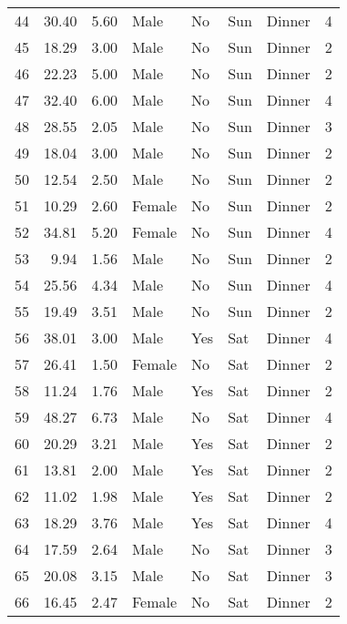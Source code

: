 \begin{tabular}{lrrllllr}
44  &       30.40 &   5.60 &    Male &     No &   Sun &  Dinner &     4 \\
45  &       18.29 &   3.00 &    Male &     No &   Sun &  Dinner &     2 \\
46  &       22.23 &   5.00 &    Male &     No &   Sun &  Dinner &     2 \\
47  &       32.40 &   6.00 &    Male &     No &   Sun &  Dinner &     4 \\
48  &       28.55 &   2.05 &    Male &     No &   Sun &  Dinner &     3 \\
49  &       18.04 &   3.00 &    Male &     No &   Sun &  Dinner &     2 \\
50  &       12.54 &   2.50 &    Male &     No &   Sun &  Dinner &     2 \\
51  &       10.29 &   2.60 &  Female &     No &   Sun &  Dinner &     2 \\
52  &       34.81 &   5.20 &  Female &     No &   Sun &  Dinner &     4 \\
53  &        9.94 &   1.56 &    Male &     No &   Sun &  Dinner &     2 \\
54  &       25.56 &   4.34 &    Male &     No &   Sun &  Dinner &     4 \\
55  &       19.49 &   3.51 &    Male &     No &   Sun &  Dinner &     2 \\
56  &       38.01 &   3.00 &    Male &    Yes &   Sat &  Dinner &     4 \\
57  &       26.41 &   1.50 &  Female &     No &   Sat &  Dinner &     2 \\
58  &       11.24 &   1.76 &    Male &    Yes &   Sat &  Dinner &     2 \\
59  &       48.27 &   6.73 &    Male &     No &   Sat &  Dinner &     4 \\
60  &       20.29 &   3.21 &    Male &    Yes &   Sat &  Dinner &     2 \\
61  &       13.81 &   2.00 &    Male &    Yes &   Sat &  Dinner &     2 \\
62  &       11.02 &   1.98 &    Male &    Yes &   Sat &  Dinner &     2 \\
63  &       18.29 &   3.76 &    Male &    Yes &   Sat &  Dinner &     4 \\
64  &       17.59 &   2.64 &    Male &     No &   Sat &  Dinner &     3 \\
65  &       20.08 &   3.15 &    Male &     No &   Sat &  Dinner &     3 \\
66  &       16.45 &   2.47 &  Female &     No &   Sat &  Dinner &     2 \\

\end{tabular}
